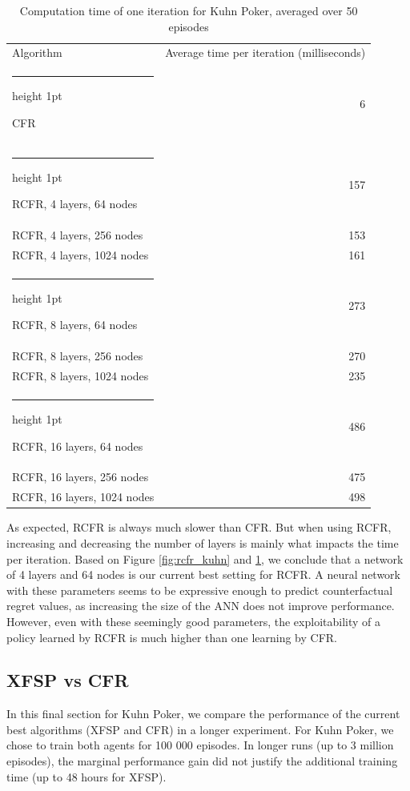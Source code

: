 \documentclass[10pt,a4paper]{article}
\makeatletter
\newcommand{\thickhline}{%
    \noalign {\ifnum 0=`}\fi \hrule height 1pt
    \futurelet \reserved@a \@xhline
}
\makeatother
\begin{document}
\begin{table}
\centering
\begin{tabular}{|l|r|}
\hline
Algorithm & Average time per iteration (milliseconds)\\
\thickhline
CFR & 6 \\
\thickhline
RCFR, 4 layers, 64 nodes& 157 \\
\hline
RCFR, 4 layers, 256 nodes & 153 \\
\hline
RCFR, 4 layers, 1024 nodes & 161 \\
\thickhline
RCFR, 8 layers, 64 nodes & 273 \\
\hline
RCFR, 8 layers, 256 nodes  & 270 \\
\hline
RCFR, 8 layers, 1024 nodes  & 235 \\
\thickhline
RCFR, 16 layers, 64 nodes & 486 \\
\hline
RCFR, 16 layers, 256 nodes & 475 \\
\hline
RCFR, 16 layers, 1024 nodes & 498 \\
\hline
\end{tabular}
\caption{Computation time of one iteration for Kuhn Poker, averaged over 50 episodes}
\label{tbl:kuhn_times}
\end{table}

As expected, RCFR is always much slower than CFR. But when using RCFR, increasing and decreasing the number of layers is mainly what impacts the time per iteration. Based on Figure \ref{fig:rcfr_kuhn} and \ref{tbl:kuhn_times}, we conclude that a network of 4 layers and 64 nodes is our current best setting for RCFR. A neural network with these parameters seems to be expressive enough to predict counterfactual regret values, as increasing the size of the ANN does not improve performance. However, even with these seemingly good parameters, the exploitability of a policy learned by RCFR is much higher than one learning by CFR. 

\subsection{XFSP vs CFR}
 In this final section for Kuhn Poker, we compare the performance of the current best algorithms (XFSP and CFR) in a longer experiment. For Kuhn Poker, we chose to train both agents for 100 000 episodes. In longer runs (up to 3 million episodes), the marginal performance gain did not justify the additional training time (up to 48 hours for XFSP).
\end{document}
